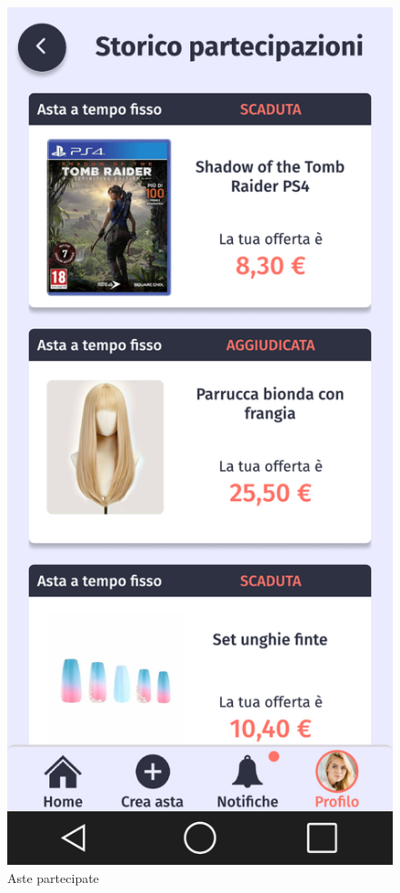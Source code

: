         \begin{figure}[!htb]
            \begin{minipage}{0.32\textwidth}
                    \centering
                    \includegraphics[width=.7\linewidth]{Immagini/Frames/Compratore/C15.pdf}
                    \caption{Aste partecipate}
            \end{minipage}\hfill
            \begin{minipage}{0.32\textwidth}
                    \centering

\end{minipage}
\end{figure}
